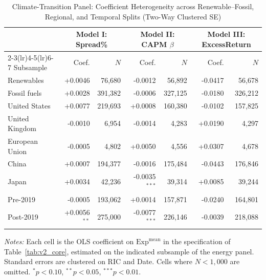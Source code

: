 \begin{table}[htbp]
\centering
\caption{Climate-Transition Panel: Coefficient Heterogeneity across Renewable--Fossil, Regional, and Temporal Splits (Two-Way Clustered SE)}
\label{tab:v2_signflip}
\begin{threeparttable}
\begin{tabular}{l r r r r r r}
\toprule
 & \multicolumn{2}{c}{Model I: Spread\%} & \multicolumn{2}{c}{Model II: CAPM $\beta$} & \multicolumn{2}{c}{Model III: ExcessReturn} \\
\cmidrule(lr){2-3}\cmidrule(lr){4-5}\cmidrule(lr){6-7}
Subsample & Coef. & $N$ & Coef. & $N$ & Coef. & $N$ \\
\midrule
Renewables & +0.0046 & 76,680 & -0.0012 & 56,892 & -0.0417 & 56,678 \\
Fossil fuels & +0.0028 & 391,382 & -0.0006 & 327,125 & -0.0180 & 326,212 \\
United States & +0.0077 & 219,693 & +0.0008 & 160,380 & -0.0102 & 157,825 \\
United Kingdom & -0.0010 & 6,954 & -0.0014 & 4,283 & +0.0190 & 4,297 \\
European Union & -0.0005 & 4,802 & +0.0050 & 4,556 & +0.0307 & 4,678 \\
China & +0.0007 & 194,377 & -0.0016 & 175,484 & -0.0443 & 176,846 \\
Japan & +0.0034 & 42,236 & -0.0035$^{***}$ & 39,314 & +0.0085 & 39,244 \\
Pre-2019 & -0.0005 & 193,062 & +0.0014 & 157,871 & -0.0240 & 164,801 \\
Post-2019 & +0.0056$^{**}$ & 275,000 & -0.0077$^{***}$ & 226,146 & -0.0039 & 218,088 \\
\bottomrule
\end{tabular}
\begin{tablenotes}\small
\item \textit{Notes:} Each cell is the OLS coefficient on $\mathrm{Exp}^{\text{mean}}$ in the
specification of Table~\ref{tab:v2_core}, estimated on the indicated subsample of the energy panel.
Standard errors are clustered on RIC and Date. Cells where $N<1{,}000$ are omitted.
$^{*}p<0.10$, $^{**}p<0.05$, $^{***}p<0.01$.
\end{tablenotes}
\end{threeparttable}
\end{table}